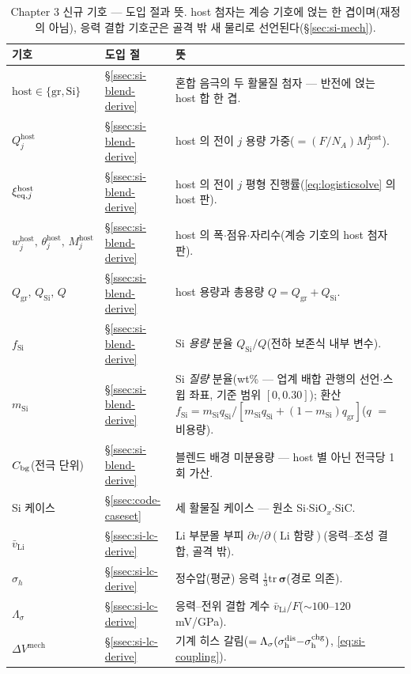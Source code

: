 \begin{table}[h]
\centering\footnotesize
\renewcommand{\arraystretch}{1.3}
\caption{Chapter 3 신규 기호 --- 도입 절과 뜻. host 첨자는 계승 기호에 얹는 한 겹이며(재정의 아님),
응력 결합 기호군은 골격 밖 새 물리로 선언된다(\S\ref{sec:si-mech}).}
\label{tab:si-notation}
\begin{tabular}{@{}p{} p{} p{}@{}}
\toprule
기호 & 도입 절 & 뜻 \\
\midrule
$\mathrm{host}\in\{\mathrm{gr},\mathrm{Si}\}$ & \S\ref{ssec:si-blend-derive} & 혼합 음극의 두 활물질 첨자 --- 반전에 얹는 host 합 한 겹. \\
$Q_j^{\mathrm{host}}$ & \S\ref{ssec:si-blend-derive} & host 의 전이 $j$ 용량 가중($=(F/N_A)M_j^{\mathrm{host}}$). \\
$\xi_{\mathrm{eq},j}^{\mathrm{host}}$ & \S\ref{ssec:si-blend-derive} & host 의 전이 $j$ 평형 진행률(\eqref{eq:logisticsolve} 의 host 판). \\
$w_j^{\mathrm{host}},\,\theta_j^{\mathrm{host}},\,M_j^{\mathrm{host}}$ & \S\ref{ssec:si-blend-derive} & host 의 폭$\cdot$점유$\cdot$자리수(계승 기호의 host 첨자판). \\
$Q_\mathrm{gr},\,Q_\mathrm{Si},\,Q$ & \S\ref{ssec:si-blend-derive} & host 용량과 총용량 $Q{=}Q_\mathrm{gr}{+}Q_\mathrm{Si}$. \\
$f_\mathrm{Si}$ & \S\ref{ssec:si-blend-derive} & Si \emph{용량} 분율 $Q_\mathrm{Si}/Q$(전하 보존식 내부 변수). \\
$m_\mathrm{Si}$ & \S\ref{ssec:si-blend-derive} & Si \emph{질량} 분율(wt\% --- 업계 배합 관행의 선언$\cdot$스윕 좌표, 기준 범위 $[0,0.30]$); 환산 $f_\mathrm{Si}=m_\mathrm{Si}q_\mathrm{Si}/[m_\mathrm{Si}q_\mathrm{Si}+(1{-}m_\mathrm{Si})q_\mathrm{gr}]$($q$ $=$ 비용량). \\
$C_{\mathrm{bg}}$(전극 단위) & \S\ref{ssec:si-blend-derive} & 블렌드 배경 미분용량 --- host 별 아닌 전극당 1회 가산. \\
Si 케이스 & \S\ref{ssec:code-caseset} & 세 활물질 케이스 --- 원소 Si$\cdot$SiO$_x$$\cdot$SiC. \\
$\bar v_\mathrm{Li}$ & \S\ref{ssec:si-lc-derive} & Li 부분몰 부피 $\partial v/\partial(\text{Li 함량})$(응력--조성 결합, 골격 밖). \\
$\sigma_h$ & \S\ref{ssec:si-lc-derive} & 정수압(평균) 응력 $\tfrac13\mathrm{tr}\,\bm\sigma$(경로 의존). \\
$\Lambda_\sigma$ & \S\ref{ssec:si-lc-derive} & 응력--전위 결합 계수 $\bar v_\mathrm{Li}/F$($\sim100$--$120$ mV/GPa). \\
$\Delta V^\mathrm{mech}$ & \S\ref{ssec:si-lc-derive} & 기계 히스 갈림($=\Lambda_\sigma(\sigma_\mathrm{h}^{\mathrm{dis}}{-}\sigma_\mathrm{h}^{\mathrm{chg}})$, \eqref{eq:si-coupling}). \\
\bottomrule
\end{tabular}
\end{table}

